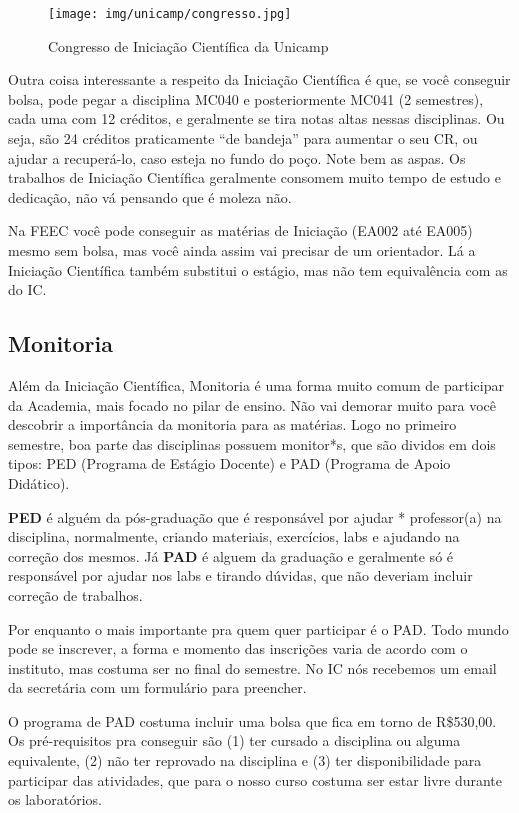\begin{figure}[h!]
    \centering
    \texttt{[image: img/unicamp/congresso.jpg]}
    \caption*{Congresso de Iniciação Científica da Unicamp}
\end{figure}

Outra coisa interessante a respeito da Iniciação Científica é que, se você
conseguir bolsa, pode pegar a disciplina MC040 e posteriormente MC041 (2
semestres), cada uma com 12 créditos, e geralmente se tira notas altas nessas
disciplinas.  Ou seja, são 24 créditos praticamente ``de bandeja'' para aumentar
o seu CR, ou ajudar a recuperá-lo, caso esteja no fundo do poço. Note bem as
aspas.  Os trabalhos de Iniciação Científica geralmente consomem muito tempo de
estudo e dedicação, não vá pensando que é moleza não.

Na FEEC você pode conseguir as matérias de Iniciação (EA002 até EA005) mesmo sem
bolsa, mas você ainda assim vai precisar de um orientador. Lá a Iniciação
Científica também substitui o estágio, mas não tem equivalência com as do IC.

\subsection{Monitoria}

Além da Iniciação Científica, Monitoria é uma forma muito comum de participar
da Academia, mais focado no pilar de ensino. Não vai demorar muito para você
descobrir a importância da monitoria para as matérias. Logo no primeiro
semestre, boa parte das disciplinas possuem monitor*s, que são dividos em dois
tipos: PED (Programa de Estágio Docente) e PAD (Programa de Apoio Didático).

\textbf{PED} é alguém da pós-graduação que é responsável por ajudar *
professor(a) na disciplina, normalmente, criando materiais, exercícios, labs e
ajudando na correção dos mesmos. Já \textbf{PAD} é alguem da graduação e
geralmente só é responsável por ajudar nos labs e tirando dúvidas, que não
deveriam incluir correção de trabalhos.

Por enquanto o mais importante pra quem quer participar é o PAD. Todo mundo
pode se inscrever, a forma e momento das inscrições varia de acordo com o
instituto, mas costuma ser no final do semestre. No IC nós recebemos um email
da secretária com um formulário para preencher. %

O programa de PAD costuma incluir uma bolsa que fica em torno de R\$530,00. %
Os pré-requisitos pra conseguir são (1) ter cursado a disciplina ou alguma
equivalente, (2) não ter reprovado na disciplina e (3) ter disponibilidade para
participar das atividades, que para o nosso curso costuma ser estar livre
durante os laboratórios.

